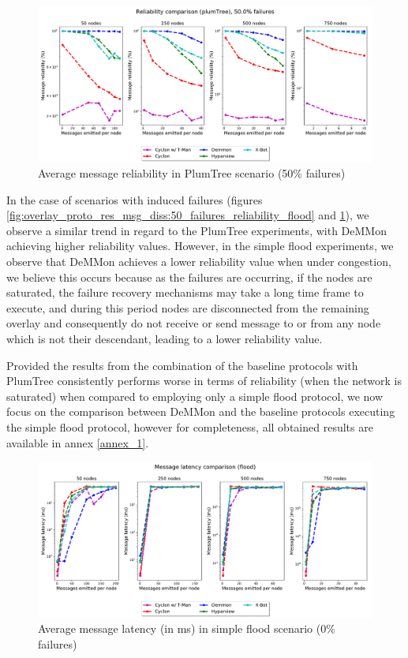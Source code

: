 \begin{figure}[htbp]
    \centering
    \includegraphics[width=\linewidth]{Chapters/evaluation/figures/flood/plumTree_50.0_failures_reliability.pdf}
    \caption{Average message reliability in PlumTree scenario (50\% failures)}
    \label{fig:overlay_proto_res_msg_diss:50_failures_reliability_plumTree}
\end{figure}

In the case of scenarios with induced failures (figures \ref{fig:overlay_proto_res_msg_diss:50_failures_reliability_flood} and \ref{fig:overlay_proto_res_msg_diss:50_failures_reliability_plumTree}), we observe a similar trend in regard to the PlumTree experiments, with DeMMon achieving higher reliability values. However, in the simple flood experiments, we observe that DeMMon achieves a lower reliability value when under congestion, we believe this occurs because as the failures are occurring, if the nodes are saturated, the failure recovery mechanisms may take a long time frame to execute, and during this period nodes are disconnected from the remaining overlay and consequently do not receive or send message to or from any node which is not their descendant, leading to a lower reliability value.

Provided the results from the combination of the baseline protocols with PlumTree consistently performs worse in terms of reliability (when the network is saturated) when compared to employing only a simple flood protocol, we now focus on the comparison between DeMMon and the baseline protocols executing the simple flood protocol, however for completeness, all obtained results are available in annex \ref{annex_1}.

\begin{figure}[htbp]
    \centering
    \includegraphics[width=\linewidth]{Chapters/evaluation/figures/flood/flood_0.0_failures_msg_lat.pdf}
    \caption{Average message latency (in ms) in simple flood scenario (0\% failures)}
    \label{fig:overlay_proto_res_msg_diss:0_failures_latency_flood}
\end{figure}

